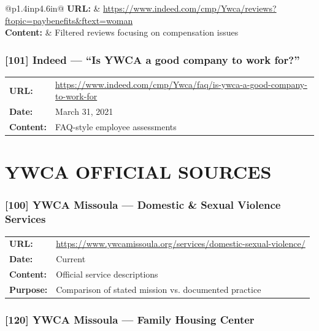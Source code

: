 \documentclass[11pt,letterpaper]{article}
\newcommand{\citeref}[1]{\textbf{\color{NavyBlue}[#1]}}
\begin{document}
\begin{tabular}{@{}p{1.4in}p{4.6in}@{}}
\textbf{URL:} & \url{https://www.indeed.com/cmp/Ywca/reviews?ftopic=paybenefits&ftext=woman}\\
\textbf{Content:} & Filtered reviews focusing on compensation issues\\
\end{tabular}

\subsubsection{\citeref{101} Indeed --- ``Is YWCA a good company to work for?''}

\begin{tabular}{@{}p{1.4in}p{4.6in}@{}}
\textbf{URL:} & \url{https://www.indeed.com/cmp/Ywca/faq/is-ywca-a-good-company-to-work-for}\\
\textbf{Date:} & March 31, 2021\\
\textbf{Content:} & FAQ-style employee assessments\\
\end{tabular}

\newpage

\section{YWCA OFFICIAL SOURCES}

\subsubsection{\citeref{100} YWCA Missoula --- Domestic \& Sexual Violence Services}

\begin{tabular}{@{}p{1.4in}p{4.6in}@{}}
\textbf{URL:} & \url{https://www.ywcamissoula.org/services/domestic-sexual-violence/}\\
\textbf{Date:} & Current\\
\textbf{Content:} & Official service descriptions\\
\textbf{Purpose:} & Comparison of stated mission vs. documented practice\\
\end{tabular}

\subsubsection{\citeref{120} YWCA Missoula --- Family Housing Center}
\end{document}
